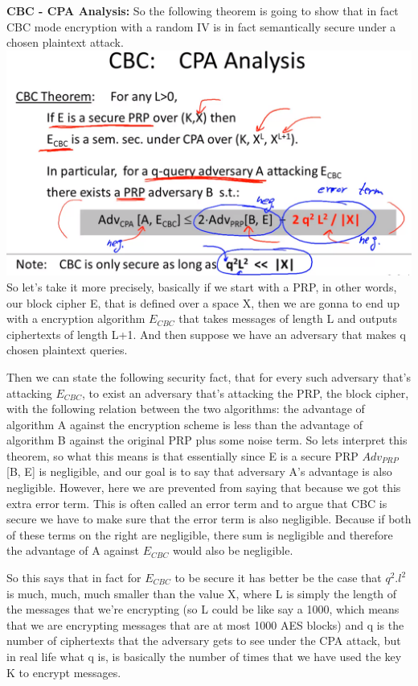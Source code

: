 \documentclass[11pt]{article}
\makeatletter
\def\maxwidth{\ifdim\Gin@nat@width>\linewidth\linewidth
    \else\Gin@nat@width\fi}
\let\Oldincludegraphics\includegraphics
\renewcommand{\includegraphics}[1]{\Oldincludegraphics[width=.8\maxwidth]{#1}}
\makeatother
\begin{document}
\textbf{CBC - CPA Analysis:} So the following theorem is going to show
that in fact CBC mode encryption with a random IV is in fact
semantically secure under a chosen plaintext attack.
\includegraphics{./Images/CBC-CPA-Analysis.png} So let's take it more
precisely, basically if we start with a PRP, in other words, our block
cipher E, that is defined over a space X, then we are gonna to end up
with a encryption algorithm \(E_{CBC}\) that takes messages of length L
and outputs ciphertexts of length L+1. And then suppose we have an
adversary that makes q chosen plaintext queries.

Then we can state the following security fact, that for every such
adversary that's attacking \(E_{CBC}\), to exist an adversary that's
attacking the PRP, the block cipher, with the following relation between
the two algorithms: the advantage of algorithm A against the encryption
scheme is less than the advantage of algorithm B against the original
PRP plus some noise term. So lets interpret this theorem, so what this
means is that essentially since E is a secure PRP \(Adv_{PRP}\){[}B,
E{]} is negligible, and our goal is to say that adversary A's advantage
is also negligible. However, here we are prevented from saying that
because we got this extra error term. This is often called an error term
and to argue that CBC is secure we have to make sure that the error term
is also negligible. Because if both of these terms on the right are
negligible, there sum is negligible and therefore the advantage of A
against \(E_{CBC}\) would also be negligible.

So this says that in fact for \(E_{CBC}\) to be secure it has better be
the case that \(q^{2}\).\(l^{2}\) is much, much, much smaller than the
value X, where L is simply the length of the messages that we're
encrypting (so L could be like say a 1000, which means that we are
encrypting messages that are at most 1000 AES blocks) and q is the
number of ciphertexts that the adversary gets to see under the CPA
attack, but in real life what q is, is basically the number of times
that we have used the key K to encrypt messages.
\end{document}
